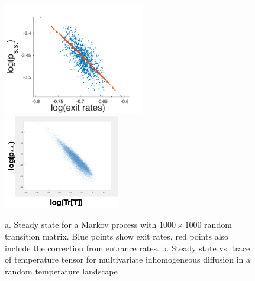 \documentclass[11pt]{article}
\renewcommand{\=}[1]{\stackrel{#1}{=}} %
\renewcommand{\(}{\left (}
\renewcommand{\)}{\right  )}
\renewcommand{\[}{\left [}
\renewcommand{\]}{\right ]}
\newcommand{\<}{\left <}
\renewcommand{\>}{\right >}
\theoremstyle{definition}
\theoremstyle{remark}
\begin{document}
\begin{figure}
	\includegraphics[width=0.55\textwidth]{randMark.pdf}
	\includegraphics[width=0.45\textwidth]{randDiff.png}
	\caption{a. Steady state for a Markov process with $ 1000 \times 1000 $ random transition matrix. Blue points show exit rates, red points also include the correction from entrance rates.
	b. Steady state vs. trace of temperature tensor for multivariate inhomogeneous diffusion in a random temperature landscape}
	\label{fig:randDynamics}
\end{figure}
\end{document}
